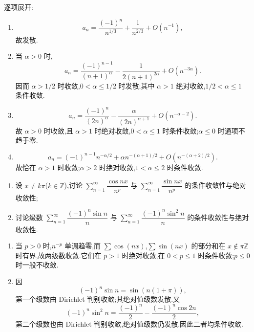 \begin{solution}
    逐项展开:
    \begin{enumerate}
        \item
              \[
                  a_n=\dfrac{(-1)^n}{n^{1/3}}+\dfrac{1}{n^{2/3}}+O(n^{-1}),
              \]
              故发散.
        \item 当 $\alpha>0$ 时,
              \[
                  a_n=\dfrac{(-1)^{n-1}}{(n+1)^\alpha}
                  -\dfrac{1}{2(n+1)^{2\alpha}}+O(n^{-3\alpha}).
              \]
              因而 $\alpha>1/2$ 时收敛,$0<\alpha\leq1/2$ 时发散;其中
              $\alpha>1$ 绝对收敛,$1/2<\alpha\leq1$ 条件收敛.
        \item
              \[
                  a_n=\dfrac{(-1)^n}{(2n)^\alpha}
                  -\dfrac{\alpha}{(2n)^{\alpha+1}}+O(n^{-\alpha-2}).
              \]
              故 $\alpha>0$ 时收敛,且 $\alpha>1$ 时绝对收敛,$0<\alpha\leq1$ 时条件收敛;$\alpha\leq0$ 时通项不趋于零.
        \item
              \[
                  a_n=(-1)^{n-1}n^{-\alpha/2}
                  +\alpha n^{-(\alpha+1)/2}+O(n^{-(\alpha+2)/2}).
              \]
              故恰在 $\alpha>1$ 时收敛;$\alpha>2$ 时绝对收敛,$1<\alpha\leq2$ 时条件收敛.
    \end{enumerate}
\end{solution}

\begin{example}
    \begin{enumerate}
        \item 设 $x\neq k\pi$($k\in\mathbb{Z}$),讨论 $\displaystyle\sum\limits_{n=1}^{\infty}\dfrac{\cos nx}{n^p}$ 与 $\displaystyle\sum\limits_{n=1}^{\infty}\dfrac{\sin nx}{n^p}$ 的条件收敛性与绝对收敛性;
        \item 讨论级数 $\displaystyle\sum\limits_{n=1}^{\infty}\dfrac{(-1)^n\sin n}{n}$ 与 $\displaystyle\sum\limits_{n=1}^{\infty}\dfrac{(-1)^n\sin^2n}{n}$ 的条件收敛性与绝对收敛性.
    \end{enumerate}
\end{example}
\exampleblank

\begin{solution}
    \leavevmode
    \begin{enumerate}
        \item 当 $p>0$ 时,$n^{-p}$ 单调趋零,而 $\displaystyle \sum\cos(nx)$,$\displaystyle \sum\sin(nx)$ 的部分和在 $x\notin\pi\mathbb{Z}$ 时有界,故两级数收敛.它们在 $p>1$ 时绝对收敛,在 $0<p\leq1$ 时条件收敛;$p\leq0$ 时一般不收敛.
        \item 因
              \[
                  (-1)^n\sin n=\sin(n(1+\pi)),
              \]
              第一个级数由 Dirichlet 判别收敛;其绝对值级数发散.又
              \[
                  (-1)^n\sin^2n=\dfrac{(-1)^n}{2}-\dfrac{(-1)^n\cos2n}{2},
              \]
              第二个级数也由 Dirichlet 判别收敛,绝对值级数仍发散.因此二者均条件收敛.
    \end{enumerate}
\end{solution}

